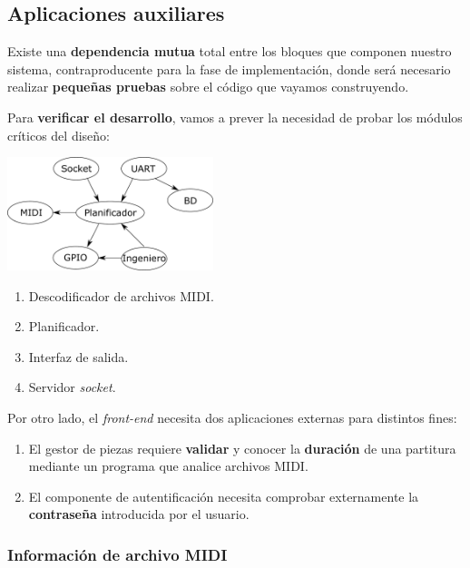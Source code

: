 \documentclass[10pt,a4paper]{article}
\begin{document}
	\subsection{Aplicaciones auxiliares}
	
	Existe una \textbf{dependencia mutua} total entre los bloques que componen nuestro sistema, contraproducente para la fase de implementación, donde será necesario realizar \textbf{pequeñas pruebas} sobre el código que vayamos construyendo.
	
	Para \textbf{verificar el desarrollo}, vamos a prever la necesidad de probar los módulos críticos del diseño:
	
	\begin{multicols}{2}
		\noindent
		\begin{center}
			\includegraphics[width=0.45\textwidth]{images/daemon} 
		\end{center}
		\columnbreak
		\begin{enumerate}
			\item Descodificador de archivos MIDI.
			\item Planificador.
			\item Interfaz de salida.
			\item Servidor \textit{socket}.
		\end{enumerate}
	\end{multicols}
	
	Por otro lado, el \textit{front-end} necesita dos aplicaciones externas para distintos fines:
	
	\begin{enumerate}
		\item El gestor de piezas requiere \textbf{validar} y conocer la \textbf{duración} de una partitura mediante un programa que analice archivos MIDI.
		
		\item El componente de autentificación necesita comprobar externamente la \textbf{contraseña} introducida por el usuario.
	\end{enumerate}
	
	\subsubsection*{Información de archivo MIDI}
	
\end{document}
